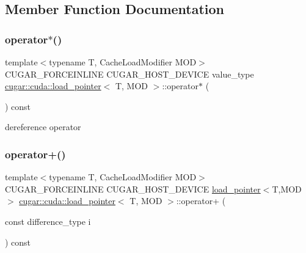 \subsection{Member Function Documentation}
\mbox{\label{structcugar_1_1cuda_1_1load__pointer_aba233f41477ba21ed512217b2d7303a1}} 
\subsubsection{\texorpdfstring{operator$\ast$()}{operator*()}}
{\footnotesize\ttfamily template$<$typename T, Cache\+Load\+Modifier M\+OD$>$ \\
C\+U\+G\+A\+R\+\_\+\+F\+O\+R\+C\+E\+I\+N\+L\+I\+NE C\+U\+G\+A\+R\+\_\+\+H\+O\+S\+T\+\_\+\+D\+E\+V\+I\+CE value\+\_\+type \hyperlink{structcugar_1_1cuda_1_1load__pointer}{cugar\+::cuda\+::load\+\_\+pointer}$<$ T, M\+OD $>$\+::operator$\ast$ (\begin{DoxyParamCaption}{ }\end{DoxyParamCaption}) const\hspace{0.3cm}{\ttfamily [inline]}}

dereference operator \mbox{\label{structcugar_1_1cuda_1_1load__pointer_a58594b15a0226632322e99011e19d4e0}} 
\subsubsection{\texorpdfstring{operator+()}{operator+()}}
{\footnotesize\ttfamily template$<$typename T, Cache\+Load\+Modifier M\+OD$>$ \\
C\+U\+G\+A\+R\+\_\+\+F\+O\+R\+C\+E\+I\+N\+L\+I\+NE C\+U\+G\+A\+R\+\_\+\+H\+O\+S\+T\+\_\+\+D\+E\+V\+I\+CE \hyperlink{structcugar_1_1cuda_1_1load__pointer}{load\+\_\+pointer}$<$T,M\+OD$>$ \hyperlink{structcugar_1_1cuda_1_1load__pointer}{cugar\+::cuda\+::load\+\_\+pointer}$<$ T, M\+OD $>$\+::operator+ (\begin{DoxyParamCaption}\item[{const difference\+\_\+type}]{i }\end{DoxyParamCaption}) const\hspace{0.3cm}{\ttfamily [inline]}}

